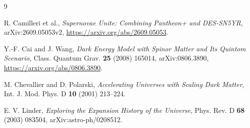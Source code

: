 \documentclass[11pt]{article}
\begin{document}
\begin{thebibliography}{9}
\raggedright

R. Camilleri et al.,
\emph{Supernovae Unite: Combining Pantheon+ and DES-SN5YR},
arXiv:2609.05053v2,
\url{https://arxiv.org/abs/2609.05053}.

Y.-F. Cai and J. Wang,
\emph{Dark Energy Model with Spinor Matter and Its Quintom Scenario},
Class. Quantum Grav. \textbf{25} (2008) 165014,
arXiv:0806.3890,
\url{https://arxiv.org/abs/0806.3890}.

M. Chevallier and D. Polarski,
\emph{Accelerating Universes with Scaling Dark Matter},
Int. J. Mod. Phys. D \textbf{10} (2001) 213--224.

E. V. Linder,
\emph{Exploring the Expansion History of the Universe},
Phys. Rev. D \textbf{68} (2003) 083504,
arXiv:astro-ph/0208512.

\end{thebibliography}
\end{document}
